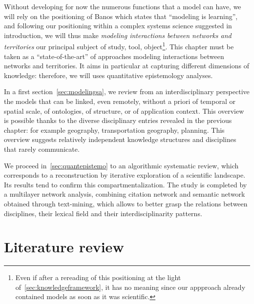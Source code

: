 \documentclass[galley]{jtlu-article-2col}
\begin{document}
Without developing for now the numerous functions that a model can have, we will rely on the positioning of Banos which states that ``modeling is learning'', and following our positioning within a complex systems science suggested in introduction, we will thus make \emph{modeling interactions between networks and territories} our principal subject of study, tool, object\footnote{Even if after a rereading of this positioning at the light of~\ref{sec:knowledgeframework}, it has no meaning since our appproach already contained models as soon as it was scientific.}. This chapter must be taken as a ``state-of-the-art'' of approaches modeling interactions between networks and territories. It aims in particular at capturing different dimensions of knowledge: therefore, we will uses quantitative epistemology analyses.




In a first section~\ref{sec:modelingsa}, we review from an interdisciplinary perspective the models that can be linked, even remotely, without a priori of temporal or spatial scale, of ontologies, of structure, or of application context. This overview is possible thanks to the diverse disciplinary entries revealed in the previous chapter: for example geography, transportation geography, planning. This overview suggests relatively independent knowledge structures and disciplines that rarely communicate.


We proceed in~\ref{sec:quantepistemo} to an algorithmic systematic review, which corresponds to a reconstruction by iterative exploration of a scientific landscape. Its results tend to confirm this compartmentalization. The study is completed by a multilayer network analysis, combining citation network and semantic network obtained through text-mining, which allows to better grasp the relations between disciplines, their lexical field and their interdisciplinarity patterns.






\section{Literature review}

\end{document}
